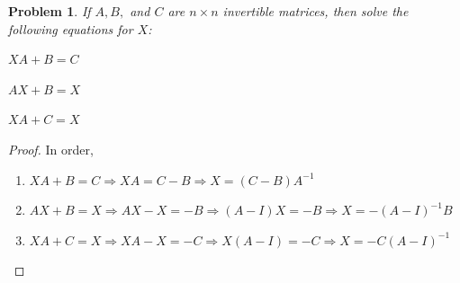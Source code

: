 \documentclass[oneside]{book}
\theoremstyle{mystyle}
\newtheorem{problem}{Problem}[section]
\begin{document}
\begin{problem}
If $A,B,$ and $C$ are $n\times n$ invertible matrices, then solve the following equations for $X$:
\begin{enumerate}
\begin{multicols}{3}
    \item $XA+B=C$
    \item $AX+B=X$
    \item $XA+C=X$
\end{multicols}
\end{enumerate}
\end{problem}
\begin{proof}
In order,
\begin{enumerate}
    \item $XA +B=C\Rightarrow XA = C-B \Rightarrow X = (C-B)A^{-1}$
    \item $AX+B = X\Rightarrow AX-X=-B \Rightarrow (A-I)X=-B \Rightarrow X = -(A-I)^{-1}B$
    \item $XA+C = X \Rightarrow XA-X = -C \Rightarrow X(A-I) = -C \Rightarrow X = -C(A-I)^{-1}$
\end{enumerate}
\end{proof}
\end{document}

